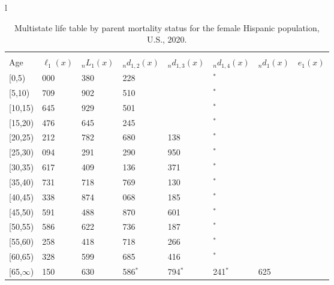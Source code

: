 \documentclass[
]{article}
\begin{document}
\begin{table}
\caption{\label{tab:table-hispanic-female}Multistate life table by parent mortality status for the female Hispanic population, U.S., 2020.}

\centering
\fontsize{9}{11}\selectfont
\begin{tabular}[t]{l}
\hline
\begin{tabular}{>{\raggedright\arraybackslash}p{.45in}>{\raggedleft\arraybackslash}p{.65in}>{\raggedleft\arraybackslash}p{.65in}>{\raggedleft\arraybackslash}p{.65in}>{\raggedleft\arraybackslash}p{.65in}>{\raggedleft\arraybackslash}p{.65in}>{\raggedleft\arraybackslash}p{.65in}>{\raggedleft\arraybackslash}p{.65in}}
\toprule
\multicolumn{1}{c}{ } & \multicolumn{7}{c}{(1) Lost neither} \\
\cmidrule(l{3pt}r{3pt}){2-8}
Age & $\ell_{1}(x)$ & ${}_nL_{1}(x)$ & ${}_nd_{1,2}(x)$ & ${}_nd_{1,3}(x)$ & ${}_nd_{1,4}(x)$ & ${}_nd_{1}(x)$ & $e_{1}(x)$\\
\midrule
{}[0,5) & 100 000 & 494 380 & 1 228 & 536 & 38$^{*}$ & 489 & 43\\
{}[5,10) & 97 709 & 483 902 & 1 510 & 512 & 0$^{*}$ & 41 & 38\\
{}[10,15) & 95 645 & 471 929 & 1 501 & 561 & 48$^{*}$ & 60 & 33\\
{}[15,20) & 93 476 & 456 645 & 2 245 & 820 & 58$^{*}$ & 141 & 28\\
{}[20,25) & 90 212 & 434 782 & 2 680 & 1 138 & 94$^{*}$ & 206 & 24\\
\addlinespace
{}[25,30) & 86 094 & 404 291 & 3 290 & 1 950 & 0$^{*}$ & 236 & 19\\
{}[30,35) & 80 617 & 365 409 & 4 136 & 2 371 & 88$^{*}$ & 291 & 15\\
{}[35,40) & 73 731 & 323 718 & 5 769 & 2 130 & 176$^{*}$ & 318 & 12\\
{}[40,45) & 65 338 & 270 874 & 5 068 & 3 185 & 127$^{*}$ & 367 & 9\\
{}[45,50) & 56 591 & 215 488 & 5 870 & 2 601 & 61$^{*}$ & 472 & 6\\
\addlinespace
{}[50,55) & 47 586 & 153 622 & 7 736 & 3 187 & 885$^{*}$ & 521 & 4\\
{}[55,60) & 35 258 & 91 418 & 4 718 & 2 266 & 469$^{*}$ & 476 & 2\\
{}[60,65) & 27 328 & 47 599 & 3 685 & 2 416 & 684$^{*}$ & 394 & 1\\
{}[65,$\infty$) & 20 150 & 53 630 & 4 586$^{*}$ & 2 794$^{*}$ & 1 241$^{*}$ & 2 625 & 1\\
\end{tabular}\\

\end{tabular}
\end{table}
\end{document}
